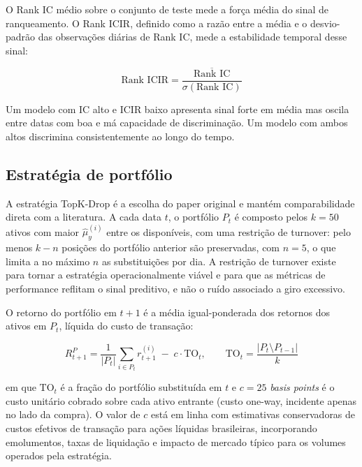 O Rank IC médio sobre o conjunto de teste mede a força média do sinal de ranqueamento.
O Rank ICIR, definido como a razão entre a média e o desvio-padrão das observações
diárias de Rank IC, mede a estabilidade temporal desse sinal:

\begin{equation}
    \text{Rank ICIR} = \frac{\overline{\text{Rank IC}}}{\sigma(\text{Rank IC})}
    \label{eq:rank-icir}
\end{equation}

Um modelo com IC alto e ICIR baixo apresenta sinal forte em média mas oscila entre
datas com boa e má capacidade de discriminação. Um modelo com ambos altos discrimina
consistentemente ao longo do tempo.


\subsection{Estratégia de portfólio}
\label{subsec:avaliacao-portfolio}

A estratégia TopK-Drop \parencite{yang2020} é a escolha do paper original e mantém
comparabilidade direta com a literatura. A cada data $t$, o portfólio $P_t$ é composto
pelos $k = 50$ ativos com maior $\hat{\mu}_y^{(i)}$ entre os disponíveis, com uma
restrição de turnover: pelo menos $k - n$ posições do portfólio anterior são
preservadas, com $n = 5$, o que limita a no máximo $n$ as substituições por dia. A
restrição de turnover existe para tornar a estratégia operacionalmente viável e para
que as métricas de performance reflitam o sinal preditivo, e não o ruído associado a
giro excessivo.

O retorno do portfólio em $t{+}1$ é a média igual-ponderada dos retornos dos ativos em
$P_t$, líquida do custo de transação:

\begin{equation}
    R_{t+1}^P = \frac{1}{|P_t|}\sum_{i \in P_t} r_{t+1}^{(i)} \;-\; c \cdot
    \text{TO}_t, \qquad \text{TO}_t = \frac{|P_t \setminus P_{t-1}|}{k}
    \label{eq:retorno-portfolio}
\end{equation}

em que $\text{TO}_t$ é a fração do portfólio substituída em $t$ e $c = 25$
\textit{basis points} é o custo unitário cobrado sobre cada ativo entrante (custo
one-way, incidente apenas no lado da compra). O valor de $c$ está em linha com
estimativas conservadoras de custos efetivos de transação para ações líquidas
brasileiras, incorporando emolumentos, taxas de liquidação e impacto de mercado típico
para os volumes operados pela estratégia.


